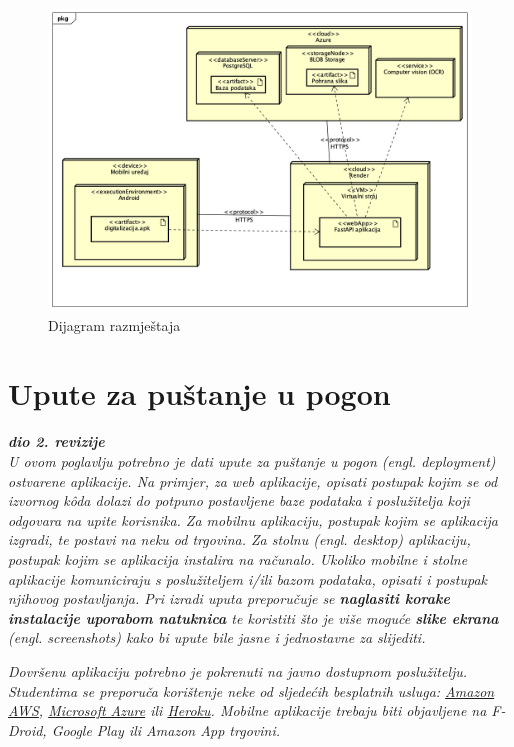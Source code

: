			 \begin{figure}[H]
			 	\includegraphics[width=\textwidth]{slike/dijagramRazmjestaja.png}
			 	\caption{Dijagram razmještaja}
			 	\label{fig:dijagramRazmjestaja}
			 \end{figure}		
			
			\eject 
		
		\section{Upute za puštanje u pogon}
		
			\textbf{\textit{dio 2. revizije}}\\
		
			 \textit{U ovom poglavlju potrebno je dati upute za puštanje u pogon (engl. deployment) ostvarene aplikacije. Na primjer, za web aplikacije, opisati postupak kojim se od izvornog kôda dolazi do potpuno postavljene baze podataka i poslužitelja koji odgovara na upite korisnika. Za mobilnu aplikaciju, postupak kojim se aplikacija izgradi, te postavi na neku od trgovina. Za stolnu (engl. desktop) aplikaciju, postupak kojim se aplikacija instalira na računalo. Ukoliko mobilne i stolne aplikacije komuniciraju s poslužiteljem i/ili bazom podataka, opisati i postupak njihovog postavljanja. Pri izradi uputa preporučuje se \textbf{naglasiti korake instalacije uporabom natuknica} te koristiti što je više moguće \textbf{slike ekrana} (engl. screenshots) kako bi upute bile jasne i jednostavne za slijediti.}
			
			
			 \textit{Dovršenu aplikaciju potrebno je pokrenuti na javno dostupnom poslužitelju. Studentima se preporuča korištenje neke od sljedećih besplatnih usluga: \href{https://aws.amazon.com/}{Amazon AWS}, \href{https://azure.microsoft.com/en-us/}{Microsoft Azure} ili \href{https://www.heroku.com/}{Heroku}. Mobilne aplikacije trebaju biti objavljene na F-Droid, Google Play ili Amazon App trgovini.}
			
			
			\eject 